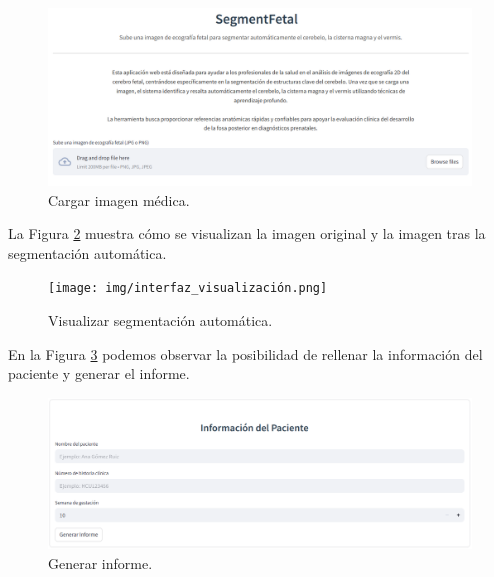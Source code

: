 \begin{figure}[h]
    \centering
    \includegraphics[width=1\textwidth]{img/interfaz_subir_imagen.png}
    \caption{Cargar imagen médica.}
    \label{fig: subir_imagen}
\end{figure}

La Figura \ref{fig: visualizar_segmentación} muestra cómo se visualizan la imagen original y la imagen tras la segmentación automática.

\begin{figure}[h]
    \centering
    \texttt{[image: img/interfaz\_visualización.png]}
    \caption{Visualizar segmentación automática.}
    \label{fig: visualizar_segmentación}
\end{figure}

En la Figura \ref{fig: generar_informe} podemos observar la posibilidad de rellenar la información del paciente y generar el informe.

\begin{figure}[h]
    \centering
    \includegraphics[width=1\textwidth]{img/interfaz_generar_informe.png}
    \caption{Generar informe.}
    \label{fig: generar_informe}
\end{figure}